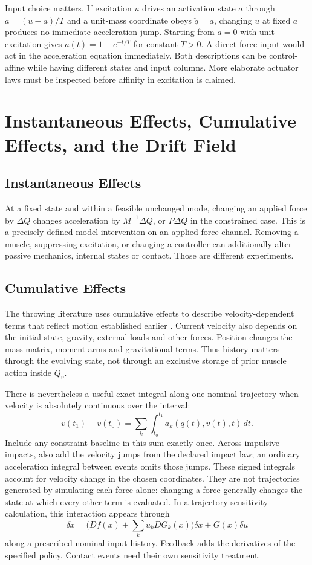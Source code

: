 Input choice matters. If excitation $u$ drives an activation state $a$ through $\dot a=(u-a)/T$ and a unit-mass coordinate obeys $\ddot q=a$, changing $u$ at fixed $a$ produces no immediate acceleration jump. Starting from $a=0$ with unit excitation gives $a(t)=1-e^{-t/T}$ for constant $T>0$. A direct force input would act in the acceleration equation immediately. Both descriptions can be control-affine while having different states and input columns. More elaborate actuator laws must be inspected before affinity in excitation is claimed.

\section{Instantaneous Effects, Cumulative Effects, and the Drift Field}
\label{sec:iaa_inst_cum}

\subsection{Instantaneous Effects}

At a fixed state and within a feasible unchanged mode, changing an applied force by $\Delta Q$ changes acceleration by $M^{-1}\Delta Q$, or $P\Delta Q$ in the constrained case. This is a precisely defined model intervention on an applied-force channel. Removing a muscle, suppressing excitation, or changing a controller can additionally alter passive mechanics, internal states or contact. Those are different experiments.

\subsection{Cumulative Effects}

The throwing literature uses cumulative effects to describe velocity-dependent terms that reflect motion established earlier \cite{Hirashima2008kinetic,Hirashima2011application}. Current velocity also depends on the initial state, gravity, external loads and other forces. Position changes the mass matrix, moment arms and gravitational terms. Thus history matters through the evolving state, not through an exclusive storage of prior muscle action inside $Q_v$.

There is nevertheless a useful exact integral along one nominal trajectory when velocity is absolutely continuous over the interval:
\[
v(t_1)-v(t_0)=\sum_k\int_{t_0}^{t_1}a_k(q(t),v(t),t)\,dt.
\]
Include any constraint baseline in this sum exactly once. Across impulsive impacts, also add the velocity jumps from the declared impact law; an ordinary acceleration integral between events omits those jumps. These signed integrals account for velocity change in the chosen coordinates. They are not trajectories generated by simulating each force alone: changing a force generally changes the state at which every other term is evaluated. In a trajectory sensitivity calculation, this interaction appears through
\[
\delta\dot x=\bigl(Df(x)+\sum_k u_k DG_k(x)\bigr)\delta x+G(x)\delta u
\]
along a prescribed nominal input history. Feedback adds the derivatives of the specified policy. Contact events need their own sensitivity treatment.

